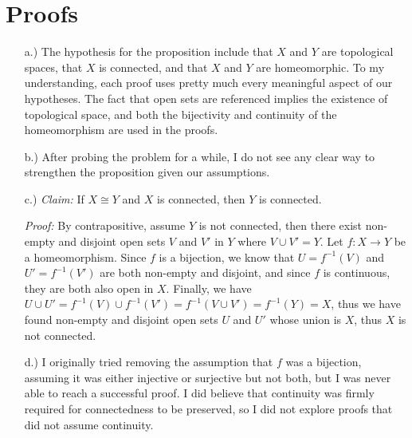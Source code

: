 \documentclass[12pt]{article}
\begin{document}
\section*{Proofs}
    \begin{itemize}
        \item [a.)] The hypothesis for the proposition include that $X$ and
        $Y$ are topological spaces, that $X$ is connected, and that $X$ and
        $Y$ are homeomorphic.
        To my understanding, each proof uses pretty much every meaningful
        aspect of our hypotheses.
        The fact that open sets are referenced implies the existence of
        topological space, and both the bijectivity and continuity of the
        homeomorphism are used in the proofs.

        \item [b.)] After probing the problem for a while, I do not see any
        clear way to strengthen the proposition given our assumptions.

        \pagebreak
        \item [c.)] \textit{Claim:} If $X \cong Y$ and $X$ is connected, then
        $Y$ is connected.

        \textit{Proof:} By contrapositive, assume $Y$ is not connected, then
        there exist non-empty and disjoint open sets $V$ and $V'$ in $Y$ where
        $V \cup V' = Y$.
        Let $f:X \to Y$ be a homeomorphism. Since $f$ is a bijection, we know
        that $U=f^{-1}(V)$ and $U'=f^{-1}(V')$ are both non-empty and
        disjoint, and since $f$ is continuous, they are both also open in $X$.
        Finally, we have $U \cup U' = f^{-1}(V) \cup f^{-1}(V')
            = f^{-1}(V \cup V') = f^{-1}(Y) = X$, thus we have found non-empty
        and disjoint open sets $U$ and $U'$ whose union is $X$, thus $X$ is not
        connected.

        \item [d.)] I originally tried removing the assumption that $f$ was a
        bijection, assuming it was either injective or surjective but not
        both, but I was never able to reach a successful proof.
        I did believe that continuity was firmly required for connectedness to
        be preserved, so I did not explore proofs that did not assume
        continuity.
        
    \end{itemize}
\end{document}
